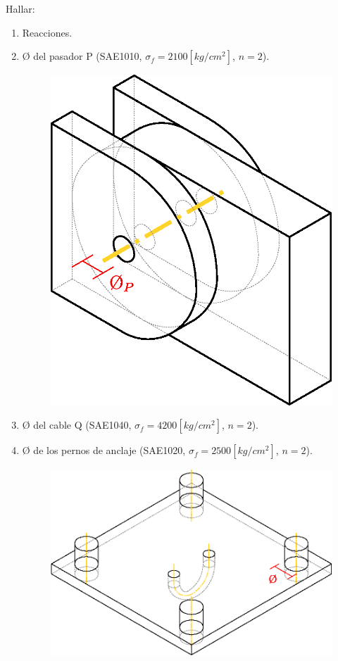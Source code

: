 \documentclass[letter,10pt,twoside]{article}
\begin{document}
Hallar:
\begin{enumerate}
    \item Reacciones.
    \item {\O} del pasador P (SAE1010, $\sigma_f=2100[kg/cm^2]$, $n=2$).
        \begin{figure}[H]
        \centering
        \includegraphics[scale=0.4]{resources/p01.eps}
        \end{figure}
    \item {\O} del cable Q (SAE1040, $\sigma_f=4200[kg/cm^2]$, $n=2$).
    \item {\O} de los pernos de anclaje (SAE1020, $\sigma_f=2500[kg/cm^2]$, $n=2$).
        \begin{figure}[H]
        \centering
        \includegraphics[scale=0.65]{resources/p02.eps}
        \end{figure}
\end{enumerate}
\end{document}

